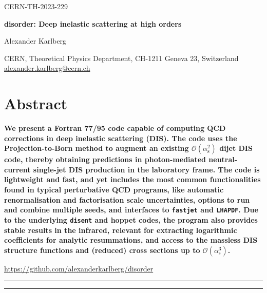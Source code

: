 \documentclass[submission, PhysCodeb]{SciPost_better_arXiv}
\newcommand{\hoppet}{{\sc hoppet}}
\newcommand{\disent}{{\tt disent}}
\newcommand{\fastjet}{{\tt fastjet}}
\newcommand{\lhapdf}{{\tt LHAPDF}}
\newcommand{\as}{\alpha_{\mathrm{s}}}
\newcommand{\email}[1]{\href{mailto:#1}{#1}}
\begin{document}
\begin{flushright}
CERN-TH-2023-229
\end{flushright}
\begin{center}{\Large \textbf{
disorder: Deep inelastic scattering at high orders\\
}}\end{center}

\begin{center}
Alexander Karlberg
\end{center}

\begin{center}
CERN, Theoretical Physics Department, CH-1211 Geneva 23, Switzerland
\\[0.5cm]
{\small \sf \email{alexander.karlberg@cern.ch}}
\end{center}



\section*{Abstract}
{\bf
We present a Fortran 77/95 code capable of computing QCD corrections
in deep inelastic scattering (DIS). The code uses the
Projection-to-Born method to augment an existing $\mathcal{O}(\as^2)$
dijet DIS code, thereby obtaining predictions in photon-mediated
neutral-current single-jet DIS production in the laboratory frame. The
code is lightweight and fast, and yet includes the most common
functionalities found in typical perturbative QCD programs, like
automatic renormalisation and factorisation scale uncertainties,
options to run and combine multiple seeds, and interfaces to
\fastjet{} and \lhapdf{}. Due to the underlying \disent{} and
\hoppet{} codes, the program also provides stable results in the
infrared, relevant for extracting logarithmic coefficients for
analytic resummations, and access to the massless DIS structure
functions and (reduced) cross sections up to $\mathcal{O}(\as^3)$.}


\vspace{10pt}
\begin{center}\url{https://github.com/alexanderkarlberg/disorder}\end{center}
\vspace{10pt}
\noindent\rule{\textwidth}{1pt}
\tableofcontents\thispagestyle{fancy}
\noindent\rule{\textwidth}{1pt}
\newpage
\end{document}
